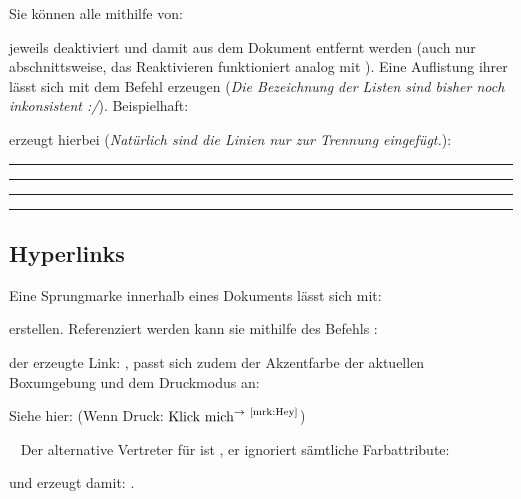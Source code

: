 Sie können alle mithilfe von:
jeweils deaktiviert und damit aus dem Dokument entfernt werden (auch nur abschnittsweise, das Reaktivieren funktioniert analog mit ). \newline
Eine Auflistung ihrer lässt sich mit dem  Befehl erzeugen (\textit{Die Bezeichnung der Listen sind bisher noch inkonsistent :/}). Beispielhaft:
\begin{latex*}
\listofDEFINITIONS
\end{latex*}
erzeugt hierbei (\textit{Natürlich sind die Linien nur zur Trennung eingefügt.}):\clearpage
{}
\rule{\linewidth}{1.2pt}\vspace{-0.75\baselineskip}
\rule{\linewidth}{0.6pt}\vspace*{-1.5cm}
\listofDEFINITIONS
\rule{\linewidth}{0.6pt}\vspace{-0.7\baselineskip}
\rule{\linewidth}{1.2pt}

\newcommand{\printmark}[2][Linkname]{\ensuremath{\text{#1}^{\rightarrow~\text{\pageref{#2}}}}}





\subsection{Hyperlinks}
Eine Sprungmarke innerhalb eines Dokuments lässt sich mit:
\begin{latex*}
\end{latex*}
erstellen. Referenziert werden kann sie mithilfe des Befehls :
\begin{latex*}
\end{latex*}
der erzeugte Link: , passt sich zudem der Akzentfarbe der aktuellen Boxumgebung und dem Druckmodus an:\smallskip
\begin{zusammenfassung}[Testzusammenfassung]
Siehe hier:  (Wenn Druck: \printmark[Klick mich]{mrk:Hey})
\end{zusammenfassung}~\smallskip\newline
Der alternative Vertreter für  ist , er ignoriert sämtliche Farbattribute:
\begin{latex*}
\end{latex*}
und erzeugt damit: .





